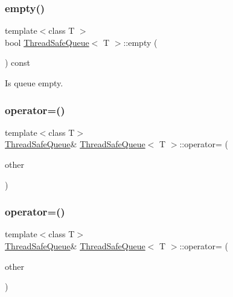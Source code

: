 \subsubsection{\texorpdfstring{empty()}{empty()}}
{\footnotesize\ttfamily template$<$class T $>$ \\
bool \hyperlink{class_thread_safe_queue}{Thread\+Safe\+Queue}$<$ T $>$\+::empty (\begin{DoxyParamCaption}{ }\end{DoxyParamCaption}) const\hspace{0.3cm}{\ttfamily [inline]}}



Is queue empty. 

\mbox{\label{class_thread_safe_queue_a6efd6d8c1d87c21d5bb422e18775e410}} 
\subsubsection{\texorpdfstring{operator=()}{operator=()}\hspace{0.1cm}{\footnotesize\ttfamily [1/2]}}
{\footnotesize\ttfamily template$<$class T$>$ \\
\hyperlink{class_thread_safe_queue}{Thread\+Safe\+Queue}\& \hyperlink{class_thread_safe_queue}{Thread\+Safe\+Queue}$<$ T $>$\+::operator= (\begin{DoxyParamCaption}\item[{\hyperlink{class_thread_safe_queue}{Thread\+Safe\+Queue}$<$ T $>$}]{other }\end{DoxyParamCaption})\hspace{0.3cm}{\ttfamily [delete]}}

\mbox{\label{class_thread_safe_queue_a10875bf953a8841619ba5bfa92e618be}} 
\subsubsection{\texorpdfstring{operator=()}{operator=()}\hspace{0.1cm}{\footnotesize\ttfamily [2/2]}}
{\footnotesize\ttfamily template$<$class T$>$ \\
\hyperlink{class_thread_safe_queue}{Thread\+Safe\+Queue}\& \hyperlink{class_thread_safe_queue}{Thread\+Safe\+Queue}$<$ T $>$\+::operator= (\begin{DoxyParamCaption}\item[{\hyperlink{class_thread_safe_queue}{Thread\+Safe\+Queue}$<$ T $>$ \&\&}]{other }\end{DoxyParamCaption})\hspace{0.3cm}{\ttfamily [delete]}}

